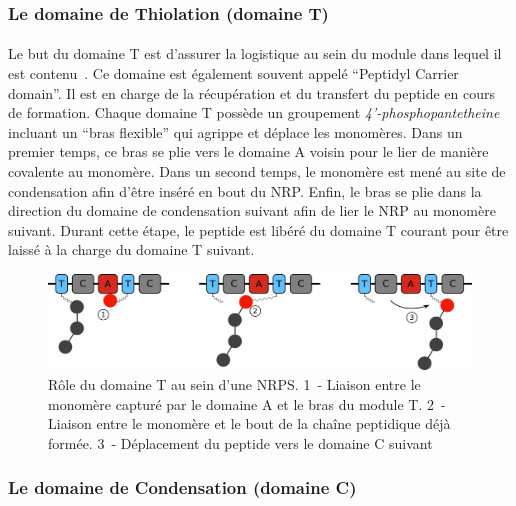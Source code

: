 \documentclass[12pt,french,twoside]{report}
\begin{document}
\subsubsection{Le domaine de Thiolation (domaine T)}

\paragraph{}Le but du domaine T est d'assurer la logistique au sein du module dans lequel il est contenu~\cite{stachelhaus_biochemical_1996,calcott_portability_2015}.
Ce domaine est également souvent appelé ``Peptidyl Carrier domain''.
Il est en charge de la récupération et du transfert du peptide en cours de formation.
Chaque domaine T possède un groupement \textit{4’-phosphopantetheine} incluant un ``bras flexible'' qui agrippe et déplace les monomères.
Dans un premier temps, ce bras se plie vers le domaine A voisin pour le lier de manière covalente au monomère.
Dans un second temps, le monomère est mené au site de condensation afin d'être inséré en bout du NRP.
Enfin, le bras se plie dans la direction du domaine de condensation suivant afin de lier le NRP au monomère suivant.
Durant cette étape, le peptide est libéré du domaine T courant pour être laissé à la charge du domaine T suivant.

\begin{figure}[h!]
  \begin{center}
    \includegraphics[width=450px]{Figures/bio/Intro/T-domain.png}
    \caption{\label{T_domain}Rôle du domaine T au sein d'une NRPS.
    1~- Liaison entre le monomère capturé par le domaine A et le bras du module T.
    2~- Liaison entre le monomère et le bout de la chaîne peptidique déjà formée.
    3~- Déplacement du peptide vers le domaine C suivant}
  \end{center}
\end{figure}

\subsubsection{Le domaine de Condensation (domaine C)}
\end{document}
